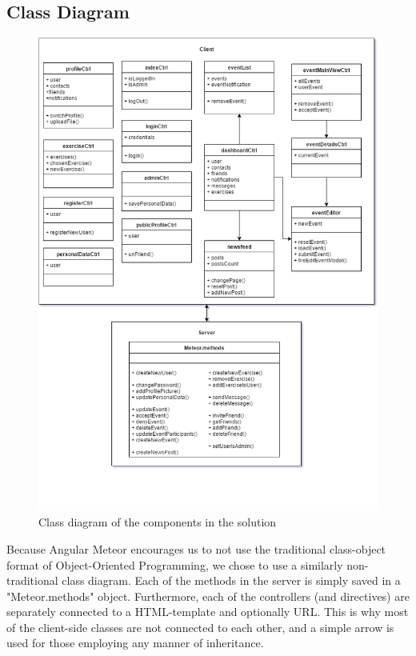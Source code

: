 \subsection{Class Diagram}
\begin{figure}[H]
\centering
\includegraphics[scale=0.6]{Figures/ClassDiagram.png}
\caption{Class diagram of the components in the solution}
\label{fig:classDiagram}
\end{figure}
Because Angular Meteor encourages us to not use the traditional class-object format of Object-Oriented Programming, we chose to use a similarly non-traditional class diagram. Each of the methods in the server is simply saved in a "Meteor.methods" object. Furthermore, each of the controllers (and directives) are separately connected to a HTML-template and optionally URL. This is why most of the client-side classes are not connected to each other, and a simple arrow is used for those employing any manner of inheritance.

